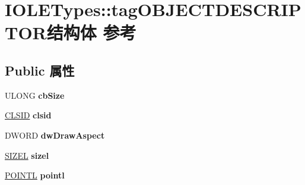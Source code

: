 \hypertarget{struct_i_o_l_e_types_1_1tag_o_b_j_e_c_t_d_e_s_c_r_i_p_t_o_r}{}\section{I\+O\+L\+E\+Types\+:\+:tag\+O\+B\+J\+E\+C\+T\+D\+E\+S\+C\+R\+I\+P\+T\+O\+R结构体 参考}
\label{struct_i_o_l_e_types_1_1tag_o_b_j_e_c_t_d_e_s_c_r_i_p_t_o_r}
\subsection*{Public 属性}
\begin{DoxyCompactItemize}
\item 
\mbox{\label{struct_i_o_l_e_types_1_1tag_o_b_j_e_c_t_d_e_s_c_r_i_p_t_o_r_a40a5b1d254da13e7e82d0ecfecabbe35}} 
U\+L\+O\+NG {\bfseries cb\+Size}
\item 
\mbox{\label{struct_i_o_l_e_types_1_1tag_o_b_j_e_c_t_d_e_s_c_r_i_p_t_o_r_a646b14605aec879bd9e90bf9dc45e796}} 
\hyperlink{struct___i_i_d}{C\+L\+S\+ID} {\bfseries clsid}
\item 
\mbox{\label{struct_i_o_l_e_types_1_1tag_o_b_j_e_c_t_d_e_s_c_r_i_p_t_o_r_a0eabc32f635c9c9754b57c46ba83fbe5}} 
D\+W\+O\+RD {\bfseries dw\+Draw\+Aspect}
\item 
\mbox{\label{struct_i_o_l_e_types_1_1tag_o_b_j_e_c_t_d_e_s_c_r_i_p_t_o_r_a0863f741e4c974c07db1222b9d446377}} 
\hyperlink{structtag_s_i_z_e}{S\+I\+Z\+EL} {\bfseries sizel}
\item 
\mbox{\label{struct_i_o_l_e_types_1_1tag_o_b_j_e_c_t_d_e_s_c_r_i_p_t_o_r_a68d92d48be37afc421afbd3abfd93c9b}} 
\hyperlink{struct___p_o_i_n_t_l}{P\+O\+I\+N\+TL} {\bfseries pointl}
\item 
\mbox{\label{struct_i_o_l_e_types_1_1tag_o_b_j_e_c_t_d_e_s_c_r_i_p_t_o_r_a54bb365ba0ecad4295ef375143be4d79}} 

\end{DoxyCompactItemize}

